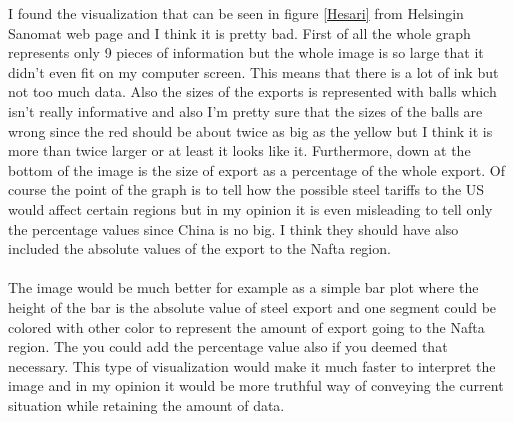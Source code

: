 \documentclass[a4paper,10pt]{article}
\begin{document}
I found the visualization that can be seen in figure \ref{Hesari} from Helsingin Sanomat web page and I think it is pretty bad. First of all the whole graph represents only 9 pieces of information but the whole image is so large that it didn't even fit on my computer screen. This means that there is a lot of ink but not too much data. Also the sizes of the exports is represented with balls which isn't really informative and also I'm pretty sure that the sizes of the balls are wrong since the red should be about twice as big as the yellow but I think it is more than twice larger or at least it looks like it. Furthermore, down at the bottom of the image is the size of export as a percentage of the whole export. Of course the point of the graph is to tell how the possible steel tariffs to the US would affect certain regions but in my opinion it is even misleading to tell only the percentage values since China is no big. I think they should have also included the absolute values of the export to the Nafta region.
\\\\
The image would be much better for example as a simple bar plot where the height of the bar is the absolute value of steel export and one segment could be colored with other color to represent the amount of export going to the Nafta region. The you could add the percentage value also if you deemed that necessary. This type of visualization would make it much faster to interpret the image and in my opinion it would be more truthful way of conveying the current situation while retaining the amount of data. 
\end{document}
